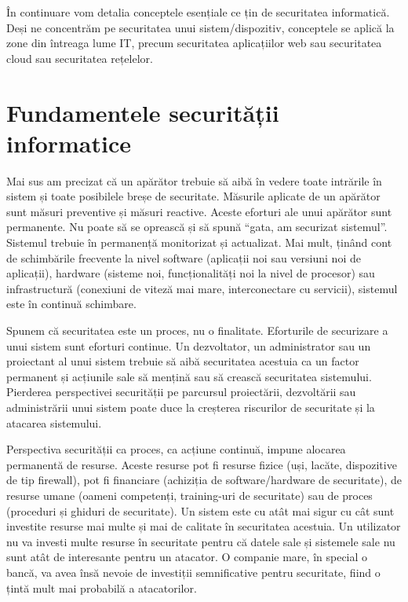 În continuare vom detalia conceptele esențiale ce țin de securitatea informatică. Deși ne concentrăm pe securitatea unui sistem/dispozitiv, conceptele se aplică la zone din întreaga lume IT, precum securitatea aplicațiilor web sau securitatea cloud sau securitatea rețelelor.

\section{Fundamentele securității informatice}
\label{sec:sec:fundamentals}

Mai sus am precizat că un apărător trebuie să aibă în vedere toate intrările în sistem și toate posibilele breșe de securitate. Măsurile aplicate de un apărător sunt măsuri preventive și măsuri reactive. Aceste eforturi ale unui apărător sunt permanente. Nu poate să se oprească și să spună “gata, am securizat sistemul”. Sistemul trebuie în permanență monitorizat și actualizat. Mai mult, ținând cont de schimbările frecvente la nivel software (aplicații noi sau versiuni noi de aplicații), hardware (sisteme noi, funcționalități noi la nivel de procesor) sau infrastructură (conexiuni de viteză mai mare, interconectare cu servicii), sistemul este în continuă schimbare.

Spunem că securitatea este un proces, nu o finalitate. Eforturile de securizare a unui sistem sunt eforturi continue. Un dezvoltator, un administrator sau un proiectant al unui sistem trebuie să aibă securitatea acestuia ca un factor permanent și acțiunile sale să mențină sau să crească securitatea sistemului. Pierderea perspectivei securității pe parcursul proiectării, dezvoltării sau administrării unui sistem poate duce la creșterea riscurilor de securitate și la atacarea sistemului.

Perspectiva securității ca proces, ca acțiune continuă, impune alocarea permanentă de resurse. Aceste resurse pot fi resurse fizice (uși, lacăte, dispozitive de tip firewall), pot fi financiare (achiziția de software/hardware de securitate), de resurse umane (oameni competenți, training-uri de securitate) sau de proces (proceduri și ghiduri de securitate). Un sistem este cu atât mai sigur cu cât sunt investite resurse mai multe și mai de calitate în securitatea acestuia. Un utilizator nu va investi multe resurse în securitate pentru că datele sale și sistemele sale nu sunt atât de interesante pentru un atacator. O companie mare, în special o bancă, va avea însă nevoie de investiții semnificative pentru securitate, fiind o țintă mult mai probabilă a atacatorilor.


